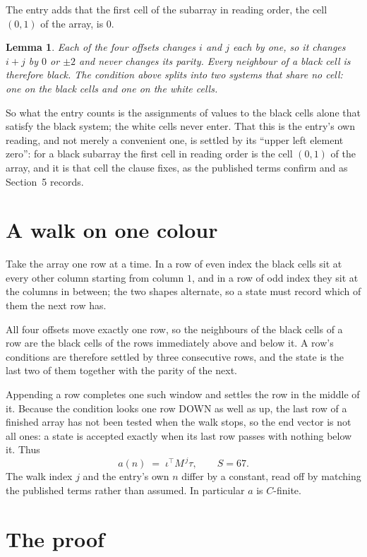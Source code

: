 \documentclass[11pt,a4paper]{article}
\theoremstyle{plain}
\newtheorem{lemma}[theorem]{Lemma}
\theoremstyle{definition}
\begin{document}
The entry adds that the first cell of the subarray in reading order, the cell $(0,1)$ of the array, is $0$.

\begin{lemma}\label{lem:split}
Each of the four offsets changes $i$ and $j$ each by one, so it changes $i+j$ by $0$ or $\pm2$
and never changes its parity. Every neighbour of a black cell is therefore black. The condition
above splits into two systems that share no cell: one on the black cells and one on the white
cells.
\end{lemma}

So what the entry counts is the assignments of values to the black cells alone that satisfy the
black system; the white cells never enter. That this is the entry's own reading, and not
merely a convenient one, is settled by its ``upper left element zero'': for a black subarray the
first cell in reading order is the cell $(0,1)$ of the array, and it is that cell the
clause fixes, as the published terms confirm and as Section~5 records.

\section{A walk on one colour}

Take the array one row at a time. In a row of even index the black cells sit at every other
column starting from column $1$, and in a row of odd index they sit at the columns in
between; the two shapes alternate, so a state must record which of them the next row has.

All four offsets move exactly one row, so the neighbours of the black cells of a row are the
black cells of the rows immediately above and below it. A row's conditions are therefore settled
by three consecutive rows, and the state is the last two of them together with the parity of the
next.

Appending a row completes one such window and settles the row in the middle of it. Because the
condition looks one row DOWN as well as up, the last row of a finished array has not been tested
when the walk stops, so the end vector is not all ones: a state is accepted exactly when its
last row passes with nothing below it. Thus
\[
a(n)\;=\;\iota^{\!\top}M^{\,j}\tau ,\qquad S=67.
\]
The walk index $j$ and the entry's own $n$ differ by a constant, read off by matching the
published terms rather than assumed. In particular $a$ is $C$-finite.

\section{The proof}
\end{document}
